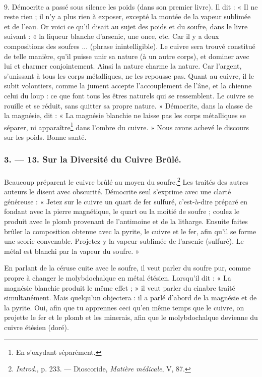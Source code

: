 \documentclass[landscape, a4paper, 11pt, oneside, polutonikogreek, french]{article}
\begin{document}
\paragraph{}
9. Démocrite a passé sous silence les poids (dans son premier livre). Il dit : « Il ne reste rien ; il n'y a plus rien à exposer, excepté la montée de la vapeur sublimée et de l'eau. Or voici ce qu'il disait au sujet des poids et du soufre, dans le livre suivant : « la liqueur blanche d'arsenic, une once, etc. Car il y a deux compositions des soufres ... (phrase inintelligible). Le cuivre sera trouvé constitué de telle manière, qu'il puisse unir sa nature (à un autre corps), et dominer avec lui et charmer conjointement. Ainsi la nature charme la nature. Car l'argent, s'unissant à tous les corps métalliques, ne les repousse pas. Quant au cuivre, il le subit volontiers, comme la jument accepte l'accouplement de l'âne, et la chienne celui du loup : ce que font tous les êtres naturels qui se ressemblent. Le cuivre se rouille et se réduit, sans quitter sa propre nature. » Démocrite, dans la classe de la magnésie, dit : « La magnésie blanchie ne laisse pas les corps métalliques se séparer, ni apparaître\footnote{En s'oxydant séparément.} dans l'ombre du cuivre. » Nous avons achevé le discours sur les poids. Bonne santé.
\clearpage
\bigskip
\centerline{\EightStarTaper}
\centerline{\EightStarTaper\EightStarTaper}
\bigskip

\subsubsection{3. --- 13. Sur la Diversité du Cuivre Brûlé.}
\paragraph{}
Beaucoup préparent le cuivre brûlé au moyen du soufre.\footnote{\emph{Introd.}, p. 233. --- Dioscoride, \emph{Matière médicale}, V, 87.} Les traités des autres auteurs le disent avec obscurité. Démocrite seul s'exprime avec une clarté généreuse : « Jetez sur le cuivre un quart de fer sulfuré, c'est-à-dire préparé en fondant avec la pierre magnétique, le quart ou la moitié de soufre ; coulez le produit avec le plomb provenant de l'antimoine et de la litharge. Ensuite faites brûler la composition obtenue avec la pyrite, le cuivre et le fer, afin qu'il se forme une scorie convenable. Projetez-y la vapeur sublimée de l'arsenic (sulfuré). Le métal est blanchi par la vapeur du soufre. »

En parlant de la céruse cuite avec le soufre, il veut parler du soufre pur, comme propre à changer le molybdochalque en métal étésien. Lorsqu'il dit : « La magnésie blanchie produit le même effet ; » il veut parler du cinabre traité simultanément. Mais quelqu'un objectera : il a parlé d'abord de la magnésie et de la pyrite. Oui, afin que tu apprennes ceci qu'en même temps que le cuivre, on projette le fer et le plomb et les minerais, afin que le molybdochalque devienne du cuivre étésien (doré).
\end{document}
